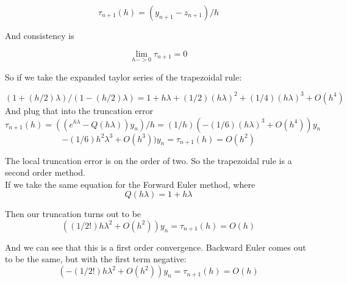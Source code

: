 \documentclass{article}
\begin{document}
\begin{equation}
    \tau_{n+1}(h) = (y_{n+1} - z_{n+1})/h
\end{equation}

And consistency is

\begin{equation}
    \lim_{h->0}\tau_{n+1} = 0
\end{equation}

So if we take the expanded taylor series of the trapezoidal rule:

\begin{equation}
    (1+(h/2)\lambda)/(1-(h/2)\lambda) = 1 + h\lambda + (1/2)(h\lambda)^2 + (1/4)(h\lambda)^3 + O(h^4)
\end{equation}
And plug that into the truncation error
\begin{equation}
    \tau_{n+1}(h) = ((e^{h\lambda} - Q(h\lambda))y_n)/h = (1/h)(-(1/6)(h\lambda)^3 + O(h^4))y_n    
\end{equation}
\begin{equation}
    -(1/6)h^2\lambda^3 + O(h^3))y_n = \tau_{n+1}(h) = O(h^2)
\end{equation}

The local truncation error is on the order of two. So the trapezoidal rule is a second order method.\\

If we take the same equation for the Forward Euler method, where 
\begin{equation}
    Q(h\lambda) = 1 + h\lambda
\end{equation}

Then our truncation turns out to be
\begin{equation}
    ((1/2!)h\lambda^2 + O(h^2))y_n = \tau_{n+1}(h) = O(h)
\end{equation}

And we can see that this is a first order convergence. Backward Euler comes out to be
the same, but with the first term negative:
\begin{equation}
    (-(1/2!)h\lambda^2 + O(h^2))y_n = \tau_{n+1}(h) = O(h)
\end{equation}
\end{document}
